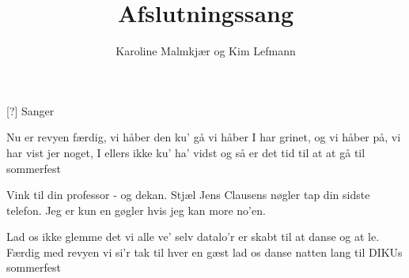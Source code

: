 \documentclass[a4paper,11pt]{article}
\title{Afslutningssang}
\author{Karoline Malmkjær og Kim Lefmann}
\begin{document}
\maketitle

\begin{roles}
[?] Sanger
\end{roles}

\begin{song}

Nu er revyen færdig, vi håber den ku' gå
vi håber I har grinet, og vi håber på,
vi har vist jer noget, I ellers ikke ku' ha' vidst
og så er det tid til at at gå til sommerfest

Vink til din
professor -
og dekan.
Stjæl Jens Clausens nøgler
tap din sidste telefon.
Jeg er kun en gøgler 
hvis jeg kan 
more no'en.

Lad os ikke glemme det vi alle ve'
selv datalo'r er skabt til at danse og at le.
Færdig med revyen vi si'r tak til hver en gæst
lad os danse natten lang til DIKUs sommerfest

\end{song}
\end{document}
